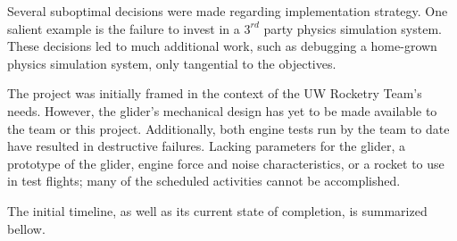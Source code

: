 \documentclass{sydeStyle}
\begin{document}
Several suboptimal decisions were made regarding implementation strategy. One
salient example is the failure to invest in a $3^{rd}$ party physics simulation
system. These decisions led to much additional work, such as debugging a
home-grown physics simulation system, only tangential to the objectives.

The project was initially framed in the context of the UW Rocketry Team's needs.
However, the glider's mechanical design has yet to be made available to the team or
this project. Additionally, both engine tests run by the team to date have
resulted in destructive failures. Lacking parameters for the glider, a prototype
of the glider, engine force and noise characteristics, or a rocket to use in
test flights; many of the scheduled activities cannot be accomplished.

The initial timeline, as well as its current state of completion, is summarized
bellow.
\end{document}
